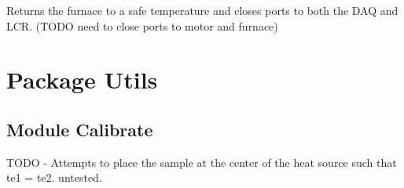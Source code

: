 \documentclass[letterpaper,10pt,english]{sphinxmanual}
\begin{document}
\begin{fulllineitems}
\begin{fulllineitems}
\begin{quote}
\begin{description}
\end{description}\end{quote}

\end{fulllineitems}


\begin{fulllineitems}
\label{\detokenize{source/laboratory:laboratory.setup.Setup.shut_down}}
Returns the furnace to a safe temperature and closes ports to both the DAQ and LCR. (TODO need to close ports to motor and furnace)

\end{fulllineitems}


\end{fulllineitems}

\label{\detokenize{source/laboratory:module-laboratory}}

\chapter{Package Utils}
\label{\detokenize{source/laboratory.utils:package-utils}}\label{\detokenize{source/laboratory.utils::doc}}

\section{Module Calibrate}
\label{\detokenize{source/laboratory.utils:module-laboratory.utils.calibrate}}\label{\detokenize{source/laboratory.utils:module-calibrate}}

\begin{fulllineitems}
\label{\detokenize{source/laboratory.utils:laboratory.utils.calibrate.find_center}}
TODO - Attempts to place the sample at the center of the heat source such that
te1 = te2. untested.

\end{fulllineitems}
\end{document}

